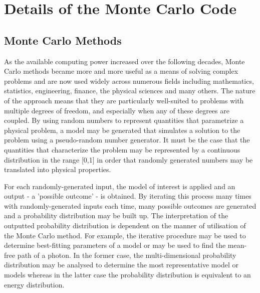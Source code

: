 \chapter{Details of the Monte Carlo Code}\label{chp:chp2}

%
%


\section{Monte Carlo Methods}
	 
	 
	 As the available computing power increased over the following decades, Monte Carlo methods became more and more useful as a means of solving complex problems and are now used widely across numerous fields including mathematics, statistics, engineering, finance, the physical sciences and many others.  The nature of the approach means that they are particularly well-suited to problems with multiple degrees of freedom, and especially when any of these degrees are coupled.  By using random numbers to represent quantities that parametrize a physical problem, a model may be generated that simulates a solution to the problem using a pseudo-random number generator.   It must be the case that the quantities that characterize the problem may be represented by a continuous distribution in the range [0,1] in order that randomly generated numbers may be translated into physical properties.  
	 
	 For each randomly-generated input, the model of interest is applied and an output - a 'possible outcome' - is obtained.  By iterating this process many times with randomly-generated inputs each time, many possible outcomes are generated and a probability distribution may be built up.  The interpretation of the outputted probability distribution is dependent on the manner of utilisation of the Monte Carlo method.  For example, the iterative procedure may be used to determine best-fitting parameters of a model or may be used to find the mean-free path of a photon.  In the former case, the multi-dimensional probability distribution may be analysed to determine the most representative model or models whereas in the latter case the probability distribution is equivalent to an energy distribution.
	 
